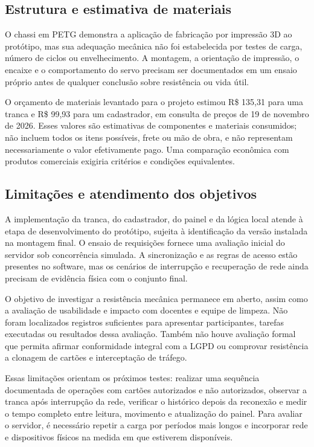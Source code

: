\documentclass[12pt]{article}
\begin{document}
\subsection{Estrutura e estimativa de materiais}

O chassi em PETG demonstra a aplicação de fabricação por impressão 3D ao protótipo, mas sua adequação mecânica não foi estabelecida por testes de carga, número de ciclos ou envelhecimento. A montagem, a orientação de impressão, o encaixe e o comportamento do servo precisam ser documentados em um ensaio próprio antes de qualquer conclusão sobre resistência ou vida útil.

O orçamento de materiais levantado para o projeto estimou R\$ 135,31 para uma tranca e R\$ 99,93 para um cadastrador, em consulta de preços de 19 de novembro de 2026. Esses valores são estimativas de componentes e materiais consumidos; não incluem todos os itens possíveis, frete ou mão de obra, e não representam necessariamente o valor efetivamente pago. Uma comparação econômica com produtos comerciais exigiria critérios e condições equivalentes.

\subsection{Limitações e atendimento dos objetivos}

A implementação da tranca, do cadastrador, do painel e da lógica local atende à etapa de desenvolvimento do protótipo, sujeita à identificação da versão instalada na montagem final. O ensaio de requisições fornece uma avaliação inicial do servidor sob concorrência simulada. A sincronização e as regras de acesso estão presentes no software, mas os cenários de interrupção e recuperação de rede ainda precisam de evidência física com o conjunto final.

O objetivo de investigar a resistência mecânica permanece em aberto, assim como a avaliação de usabilidade e impacto com docentes e equipe de limpeza. Não foram localizados registros suficientes para apresentar participantes, tarefas executadas ou resultados dessa avaliação. Também não houve avaliação formal que permita afirmar conformidade integral com a LGPD ou comprovar resistência a clonagem de cartões e interceptação de tráfego.

Essas limitações orientam os próximos testes: realizar uma sequência documentada de operações com cartões autorizados e não autorizados, observar a tranca após interrupção da rede, verificar o histórico depois da reconexão e medir o tempo completo entre leitura, movimento e atualização do painel. Para avaliar o servidor, é necessário repetir a carga por períodos mais longos e incorporar rede e dispositivos físicos na medida em que estiverem disponíveis.
\end{document}
